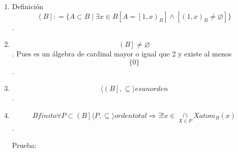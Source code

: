 \begin{enumerate}
\begin{enumerate}
\begin{enumerate}
\begin{enumerate}
        Hace lo que tiene que hacer un complementario.
      \item
        \[\forall{z \in \left\lbrack {x,0} \right\rbrack_{B}}{{{{{z'} + z} = {{x \cdot \overline{z}} + z}} = {x + z}} = x}\]
      \item
        \[\forall{z \in \left\lbrack {x,0} \right\rbrack_{B}}{{{{z'} \cdot z} = {{x \cdot \overline{z}} \cdot z}} = 0}\]

        Aplicamos la existencia de elementos átomos y que \[x\] no lo
        es.
      \item
        \[\mathsf{\mathit{atom}}_{B}{(x)}\Rightarrow{\left( {x,0} \right)_{B} \neq \varnothing}\]
      \item
        \[\exists{y \in \mathit{Atom}}{(\left\lbrack {x,0} \right\rbrack_{B})}\]
      \item
        \[y < x\]
      \end{enumerate}
    \item
      Definición
      \emph{\[\left( B \right\rbrack{: = {\{{{A \subset B} \mid \exists{x \in B}{\left\lbrack {A = \left\lbrack {1,x} \right)_{B}} \right\rbrack \land \left\lbrack {\left( {1,x} \right)_{B} \neq \varnothing} \right\rbrack}}\}}}\]}.
    \item
      \emph{\[\left( B \right\rbrack \neq \varnothing\]}. Pues es un
      álgebra de cardinal mayor o igual que 2 y existe al menos
      \[\{ 0\}\].
    \item
      \emph{\[{\langle{\left( B \right\rbrack, \subseteq}\rangle}\mathit{es}\mathit{un}\mathit{orden}\]}.
    \item
      \emph{\[B\mathit{finito}\forall{P \subset \left( B \right\rbrack}{\langle{P, \subseteq}\rangle}\mathit{orden}\mathit{total}\Rightarrow\exists!{x \in \underset{X \in P}{\cap}}X\mathsf{\mathit{atom}}_{B}{(x)}\]}.

      Prueba:


\end{enumerate}
\end{enumerate}
\end{enumerate}
